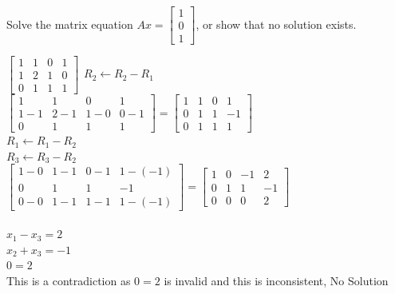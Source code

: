 \documentclass[12pt,letterpaper, onecolumn]{exam}
\begin{document}
\begin{questions}
    \question Solve the matrix equation
        $Ax = \begin{bmatrix}
            1 \\
            0 \\
            1
        \end{bmatrix}$, or show that no solution exists.
    \begin{solution}
        \begin{center}
            $\begin{bmatrix}
                1 & 1 & 0 & 1\\
                1 & 2 & 1 & 0\\
                0 & 1 & 1 & 1
            \end{bmatrix}
            \begin{matrix}
                \\
                R_2 \leftarrow R_2 - R_1\\
                \ 
            \end{matrix}$\\
            $\begin{bmatrix}
                1 & 1 & 0 & 1\\
                1 - 1 & 2 - 1 & 1 - 0 & 0 - 1\\
                0 & 1 & 1 & 1
            \end{bmatrix}
            =
            \begin{bmatrix}
                1 & 1 & 0 & 1\\
                0 & 1 & 1 & -1\\
                0 & 1 & 1 & 1
            \end{bmatrix}$\\
            $R_1 \leftarrow R_1 - R_2$\\
            $R_3 \leftarrow R_3 - R_2$\\
            $\begin{bmatrix}
                1 - 0 & 1-1 & 0-1 & 1-(-1)\\
                0 & 1 & 1 & -1\\
                0-0 & 1-1 & 1-1 & 1-(-1)
            \end{bmatrix}
            =
            \begin{bmatrix}
                1 & 0 & -1 & 2\\
                0 & 1 & 1 & -1\\
                0 & 0 & 0 & 2
            \end{bmatrix}$\\
            \ \\
            $x_1 - x_3 = 2$\\
            $x_2 + x_3 = -1$\\
            $0 = 2$\\
            This is a contradiction as $0=2$ is invalid and this is inconsistent, No Solution
        \end{center}
    \end{solution}
    \pagebreak


\end{questions}
\end{document}
